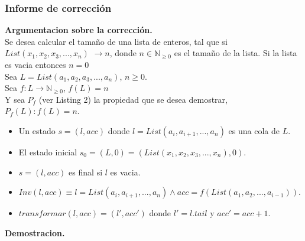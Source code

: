 \documentclass[12pt, a4paper]{article}
\begin{document}
\subsubsection{Informe de corrección}
\textbf{Argumentacion sobre la corrección.}\\
Se desea calcular el tamaño de una lista de enteros, tal que si $List(x_1,x_2,x_3,...,x_n)$ $\rightarrow n$, donde $n \in \mathbb{N}_{\geq 0}$ es el tamaño de la lista. Si la lista es vacia entonces $n=0$\\
Sea $L=List(a_1,a_2,a_3,...,a_n)$, $n\geq0$. \\
Sea $f:L \rightarrow \mathbb{N}_{\geq 0}$, $f(L)=n$\\
Y sea $P_f$ (ver Listing 2) la propiedad que se desea demostrar, $P_f(L):f(L)=n$.\\
\begin{itemize}
  \item Un estado $s=(l,acc)$ donde $l=List(a_i,a_{i+1},...,a_n)$ es una cola de $L$.
  \item El estado inicial $s_0=(L,0)=(List(x_1,x_2,x_3,...,x_n),0)$.
  \item $s = (l,acc)$ es final si $l$ es vacia.
  \item $Inv(l,acc)\equiv l = List(a_i,a_{i+1},...,a_n) \wedge acc = f(List(a_1,a_2,...,a_{i-1}))$.
  \item $transformar(l,acc) = (l',acc')$ donde $l'=l.tail$ y $acc'=acc+1$.
\end{itemize}
\textbf{Demostracion.}\\

\end{document}
